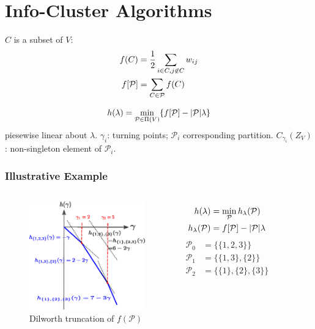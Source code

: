 \documentclass{beamer}
\DeclarePairedDelimiter\abs{\lvert}{\rvert}
\def\P{\mathcal{P}}
\begin{document}
\section{Info-Cluster Algorithms}
\begin{frame}
\begin{definition}
$C$ is a subset of $V$:
\begin{align}
f(C) & ={1 \over 2} \sum_{i\in C, j \not\in C} w_{ij} \\
f[\P] & = \sum_{C \in \P} f(C)
\end{align}
\end{definition}
\begin{theorem}
\begin{equation}\label{eq:hLambda}
h(\lambda) = \min_{\P \in \Pi(V)} \{ f[\P] - \abs{\P}\lambda \}
\end{equation} piesewise linear about $\lambda$. 
$\gamma_i$: turning points; $\P_i$ corresponding partition. $C_{\gamma_i}(Z_V)$: non-singleton element of $\P_i$.
\end{theorem}
\end{frame}
\begin{frame}
\frametitle{Illustrative Example}
\begin{columns}
\column{5cm}
\begin{figure}
\includegraphics[width=5cm]{pic/dt.eps}
\caption{Dilworth truncation of $f(\P)$}
\end{figure}
\column{5cm}
\begin{align*}
h(\lambda)  & = \min_{\P} h_{\lambda}(\P) \\
h_{\lambda}(\P) & = f[\P] - \abs{\P}\lambda
\end{align*}
\begin{align*}
\P_0  & = \{\{1,2,3\}\} \\
\P_1  & = \{\{1,3\},\{2\}\} \\
\P_2  & = \{\{1\},\{2\},\{3\}\} 
\end{align*}

\end{columns}
\end{frame}
\end{document}
